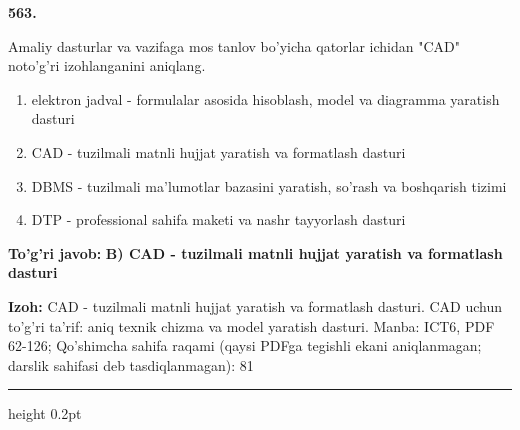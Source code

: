 \documentclass[10pt,a4paper]{article}
\begin{document}
{\bfseries\sffamily\color{ink} 563.}
\par
Amaliy dasturlar va vazifaga mos tanlov bo'yicha qatorlar ichidan "CAD" noto'g'ri izohlanganini aniqlang.
\begin{enumerate}[label=\Alph*),leftmargin=9mm]
\item elektron jadval - formulalar asosida hisoblash, model va diagramma yaratish dasturi
\item CAD - tuzilmali matnli hujjat yaratish va formatlash dasturi
\item DBMS - tuzilmali ma'lumotlar bazasini yaratish, so'rash va boshqarish tizimi
\item DTP - professional sahifa maketi va nashr tayyorlash dasturi
\end{enumerate}
\begin{tcolorbox}[enhanced,breakable,colback=teal!4,colframe=teal!60!black,boxrule=0.45pt,arc=1.2mm,left=2.7mm,right=2.7mm,top=1.8mm,bottom=1.8mm,before skip=2mm,after skip=2mm]
{\bfseries\sffamily\color{teal}To'g'ri javob:} \textbf{B) CAD - tuzilmali matnli hujjat yaratish va formatlash dasturi}
\par\smallskip
{\bfseries Izoh:} CAD - tuzilmali matnli hujjat yaratish va formatlash dasturi. CAD uchun to'g'ri ta'rif: aniq texnik chizma va model yaratish dasturi. Manba: ICT6, PDF 62-126; Qo'shimcha sahifa raqami (qaysi PDFga tegishli ekani aniqlanmagan; darslik sahifasi deb tasdiqlanmagan): 81
\end{tcolorbox}
\vspace{2mm}\hrule height 0.2pt\vspace{3mm}
\end{document}
